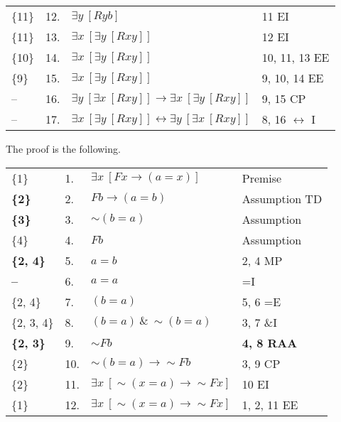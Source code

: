 \documentclass[a4paper,12pt]{article}
\newcommand{\mlra}{$\leftrightarrow$ }
\newcommand{\ra}{\rightarrow}
\newcommand{\lra}{\leftrightarrow}
\newcommand{\s}{\sim}
\newcommand{\ta}{ \ \& \ }
\newcommand{\ex}{\exists}
\begin{document}
\begin{enumerate}[label=\arabic*,leftmargin=*]
\begin{enumerate}[label=(\roman*)]
\begin{minipage}{\textwidth}
\begin{tabular}{l l l l}
                        \{11\} & 12. & $\ex y \ [Ryb]$ & 11 EI\\
                        \{11\} & 13. & $\ex x \ [\ex y \ [Rxy]]$ & 12 EI\\
                        \{10\} & 14. & $\ex x \ [\ex y \ [Rxy]]$ & 10, 11, 13 EE\\
                        \{9\} & 15. & $\ex x \ [\ex y \ [Rxy]]$ & 9, 10, 14 EE\\
                        -- & 16. & $\ex y \ [\ex x \ [Rxy]] \ra \ex x \ [\ex y \ [Rxy]]$ & 9, 15 CP\\
                        -- & 17. & $\ex x \ [\ex y \ [Rxy]] \lra \ex y \ [\ex x \ [Rxy]]$ & 8, 16 \mlra I\\
                    \end{tabular}
                    \vspace{1em}
                \end{minipage}
            \end{enumerate}

        \begin{minipage}{\textwidth}
        \item The proof is the following.\\
            \begin{tabular}{l l l l}
                \{1\}             & 1. & $\ex x \ [Fx \ra (a=x)]$ & Premise\\
                \textbf{\{2\}}    & 2. & \boldmath$Fb \ra (a=b)$ & Assumption TD\\
                \textbf{\{3\}}    & 3. & \boldmath$\s (b=a)$ & Assumption\\
                \{4\}             & 4. & $Fb$ & Assumption\\
                \textbf{\{2, 4\}} & 5. & \boldmath$a=b$ & 2, 4 MP\\
                \textbf{--}       & 6. & \boldmath$a=a$ & =I\\
                \{2, 4\}          & 7. & $(b=a)$ & 5, 6 =E\\
                \{2, 3, 4\}       & 8. & $(b=a) \ta \s (b=a)$ & 3, 7 \&I\\
                \textbf{\{2, 3\}} & 9. & $\s Fb$ & \textbf{4, 8 RAA}\\
                \{2\}             &10. & \boldmath$\s (b=a) \ra \s Fb$ & 3, 9 CP\\
                \{2\}             &11. & \boldmath$\ex x \ [\s (x=a) \ra \s Fx]$ & 10 EI\\
                \{1\}             &12. & \boldmath$\ex x \ [\s (x=a) \ra \s Fx]$ & 1, 2, 11 EE\\
            \end{tabular}
        \end{minipage}


\end{enumerate}
\end{document}
